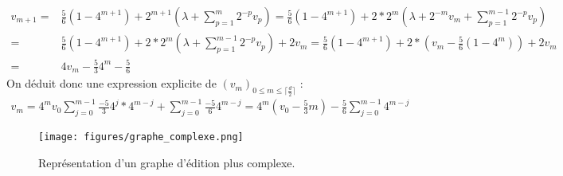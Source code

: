 \documentclass[12pt, twoside]{report}
\begin{document}
\begin{equation}
    \begin{split}
        v_{m+1} = & \frac{5}{6}(1-4^{m+1}) + 2^{m+1}\left(\lambda + \sum_{p=1}^{m} 2^{-p}v_p\right) = \frac{5}{6}(1-4^{m+1}) + 2*2^{m}\left(\lambda + 2^{-m}v_m + \sum_{p=1}^{m-1} 2^{-p}v_p\right) \\
        = & \frac{5}{6}(1-4^{m+1}) + 2*2^{m}\left(\lambda + \sum_{p=1}^{m-1} 2^{-p}v_p\right) + 2v_m = \frac{5}{6}(1-4^{m+1}) + 2*(v_m - \frac{5}{6}(1-4^{m})) + 2v_m \\
        = & 4v_m - \frac{5}{3}4^m - \frac{5}{6}
    \end{split}
\end{equation}
On déduit donc une expression explicite de $(v_m)_{0\leq m \leq \lceil \frac{d}{2} \rceil}$ :
\begin{equation}
    \begin{split}
        v_m = 4^mv_0 \sum_{j=0}^{m-1}\frac{-5}{3}4^j * 4^{m-j} + \sum_{j=0}^{m-1}\frac{-5}{6}4^{m-j} = 4^m(v_0 -\frac{5}{3}m) - \frac{5}{6}\sum_{j=0}^{m-1}4^{m-j}
    \end{split}
\end{equation}

\begin{figure}[h]{} 
    \centering
    \texttt{[image: figures/graphe\_complexe.png]}
    \caption{Représentation d'un graphe d'édition plus complexe.}
\end{figure} \label{fig:complex_graph}
\end{document}
